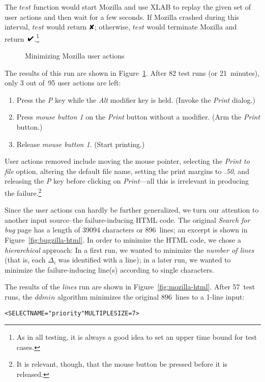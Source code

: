 \documentclass{acm_proc_article-sp}
\newcommand{\HTML}       {{\small HTML}\xspace}
\newcommand{\XLAB}       {{\small XLAB}\xspace}
\newcommand{\PASS}{\text{\ding{52}}\xspace}
\newcommand{\FAIL}{\text{\ding{56}}\xspace}
\newcommand{\test}{\textit{test}\xspace}
\newcommand{\ddmin}{\textit{ddmin}\xspace}
\newcommand{\s}{\char32}
\theoremstyle{plain}
\let\oldfootnote=\footnote
\renewcommand{\footnote}[1]{\oldfootnote{\let\small=\scriptsize #1}}
\begin{document}
The $\test$ function would start Mozilla and use \XLAB to replay the
given set of user actions and then wait for a few seconds.  If Mozilla
crashed during this interval, $\test$ would return $\FAIL$; otherwise,
$\test$ would terminate Mozilla and return~$\PASS$.\footnote{As in all
  testing, it is always a good idea to set an upper time bound for
  test cases.}

\begin{figure}[t]
\vspace{-1.1cm}
\vspace{-0.5cm}
\caption{Minimizing Mozilla user actions}
\label{fig:mozilla-events}
\vspace{-\baselineskip}
\end{figure}

The results of this run are shown in Figure~\ref{fig:mozilla-events}.
After 82 test runs (or 21~minutes), only 3 out of~95 user actions are
left:
\begin{enumerate}
\item Press the \emph{P} key while the \emph{Alt} modifier key is held.
  (Invoke the \emph{Print} dialog.)
\item Press \emph{mouse button 1}
  on the \emph{Print} button without a modifier.
  (Arm the \emph{Print} button.)
\item Release \emph{mouse button 1}.  (Start printing.)
\end{enumerate}
User actions removed include moving the mouse pointer, selecting the
\emph{Print to file} option, altering the default file name, setting
the print margins to \emph{.50}, and releasing the \emph{P} key
before clicking on \emph{Print}---all this is irrelevant in producing the
failure.\footnote{It is relevant, though, that the mouse button be
  pressed before it is released.}

Since the user actions can hardly be further generalized, we turn our
attention to another input source--the failure-inducing \HTML code.
The original \emph{Search for bug} page has a length of 39094
characters or 896~lines; an excerpt is shown in
Figure~\ref{fig:bugzilla-html}. In order to minimize the \HTML code,
we chose a \emph{hierarchical} approach: In a first run, we wanted to
minimize the \emph{number of lines} (that is, each $\Delta_i$ was
identified with a line); in a later run, we wanted to minimize the
failure-inducing line(s) according to single characters.

The results of the \emph{lines} run are shown in
Figure~\ref{fig:mozilla-html}.  After 57~test runs, the $\ddmin$
algorithm minimizes the original 896~lines to a 1-line input:
\begin{alltt}
    <SELECT{\s}NAME="priority"{\s}MULTIPLE{\s}SIZE=7>
\end{alltt}
\end{document}
